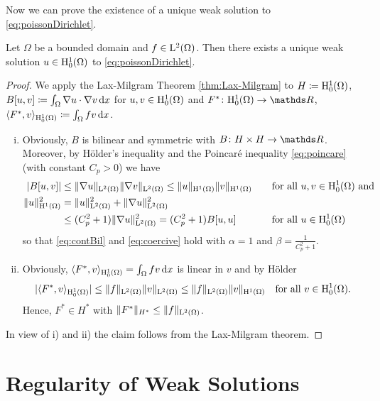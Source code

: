 Now we can prove the existence of a unique weak solution to \eqref{eq:poissonDirichlet}.

\begin{thm}
  Let $\Omega$ be a bounded domain and $f \in \mathrm{L}^2(\Omega)$.
  Then there exists a unique weak solution $u \in \mathrm{H}_0^1(\Omega)$ to \eqref{eq:poissonDirichlet}.
\end{thm}

\begin{proof}
  We apply the Lax-Milgram Theorem \ref{thm:Lax-Milgram} to $H \coloneqq \mathrm{H}_0^1(\Omega)$, $B[u,v] \coloneqq \int_\Omega \nabla u \cdot \nabla v \, {\operatorname{d}\!{x}}$ for $u,v \in \mathrm{H}_0^1(\Omega)$ and $F^* \colon \HH_0^1(\Omega) \to \R$, $\langle F^*, v \rangle_{\mathrm{H}_0^1(\Omega)} \coloneqq \int_\Omega f v \, {\operatorname{d}\!{x}}$.
  \begin{enumerate}[i)]
    \item Obviously, $B$ is bilinear and symmetric with $B \colon H \times H \to \R$.
      Moreover, by Hölder's inequality and the Poincar\'e inequality \eqref{eq:poincare} (with constant $C_p > 0$) we have
      \begin{alignat*}{2}
        |B[u,v]| 
        &\leq \|\nabla u\|_{\mathrm{L}^2(\Omega)} \|\nabla v\|_{\mathrm{L}^2(\Omega)}
        \leq \|u\|_{\mathrm{H}^1(\Omega)} \|v\|_{\mathrm{H}^1(\Omega)} &&\quad\text{for all } u, v \in \mathrm{H}_0^1(\Omega) \text{ and } \\
        \|u\|_{\mathrm{H}^1(\Omega)}^2 &= \|u\|_{\mathrm{L}^2(\Omega)}^2 + \|\nabla u\|_{\mathrm{L}^2(\Omega)}^2 &&\\
        &\leq (C_p^2 + 1) \|\nabla u\|_{\mathrm{L}^2(\Omega)}^2  
        = (C_p^2 + 1) B[u,u] &&\quad\text{for all } u \in \mathrm{H}_0^1(\Omega)
      \end{alignat*}
      so that \eqref{eq:contBil} and \eqref{eq:coercive} hold with $\alpha = 1$ and $\beta = \frac{1}{C_p^2 + 1}$.

    \item Obviously, $\langle F^*, v \rangle_{\mathrm{H}_0^1(\Omega)} = \int_\Omega f v \, {\operatorname{d}\!{x}}$ is linear in $v$ and by Hölder
      $$
      |\langle F^*, v \rangle_{\mathrm{H}_0^1(\Omega)}|
      \leq \|f\|_{\mathrm{L}^2(\Omega)} \|v\|_{\mathrm{L}^2(\Omega)}
      \leq \|f\|_{\mathrm{L}^2(\Omega)} \|v\|_{\mathrm{H}^1(\Omega)} \quad\text{for all } v \in \mathrm{H}_0^1(\Omega).
      $$
      Hence, $F^* \in H^*$ with $\|F^*\|_{H^*} \leq \| f \|_{\mathrm{L}^2(\Omega)}$.
    \end{enumerate}
  In view of i) and ii) the claim follows from the Lax-Milgram theorem.
\end{proof}

\section{Regularity of Weak Solutions}

